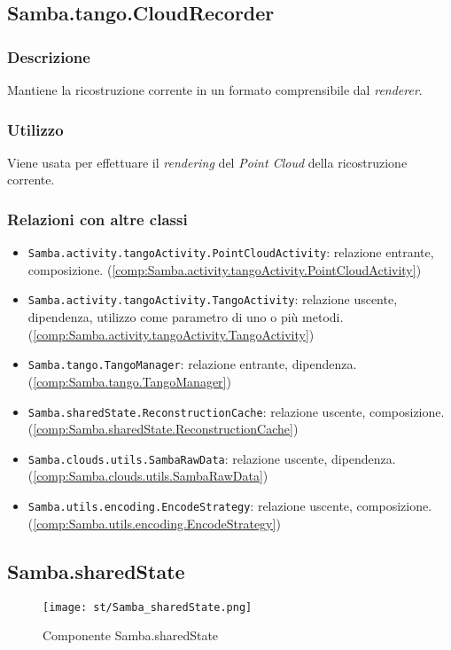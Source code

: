 \subsection{Samba.tango.CloudRecorder}\label{comp:Samba.tango.CloudRecorder}
\subsubsection{Descrizione}
Mantiene la ricostruzione corrente in un formato comprensibile dal \emph{renderer}.
\subsubsection{Utilizzo}
Viene usata per effettuare il \emph{rendering} del \emph{Point Cloud} della ricostruzione corrente.
\subsubsection{Relazioni con altre classi}
\begin{itemize}
	\item \texttt{Samba.activity.tangoActivity.PointCloudActivity}: relazione entrante, composizione. (\ref{comp:Samba.activity.tangoActivity.PointCloudActivity})
	\item \texttt{Samba.activity.tangoActivity.TangoActivity}: relazione uscente, dipendenza, utilizzo come parametro di uno o più metodi. (\ref{comp:Samba.activity.tangoActivity.TangoActivity})
	\item \texttt{Samba.tango.TangoManager}: relazione entrante, dipendenza. (\ref{comp:Samba.tango.TangoManager})
	\item \texttt{Samba.sharedState.ReconstructionCache}: relazione uscente, composizione. (\ref{comp:Samba.sharedState.ReconstructionCache})
	\item \texttt{Samba.clouds.utils.SambaRawData}: relazione uscente, dipendenza. (\ref{comp:Samba.clouds.utils.SambaRawData})
	\item \texttt{Samba.utils.encoding.EncodeStrategy}: relazione uscente, composizione. (\ref{comp:Samba.utils.encoding.EncodeStrategy})
\end{itemize}


\newpage
\subsection{Samba.sharedState}\label{comp:Samba.sharedState}
\begin{figure}[H] 
    \centering 
    \texttt{[image: st/Samba\_sharedState.png]} 
    \caption{Componente Samba.sharedState}
\end{figure}

